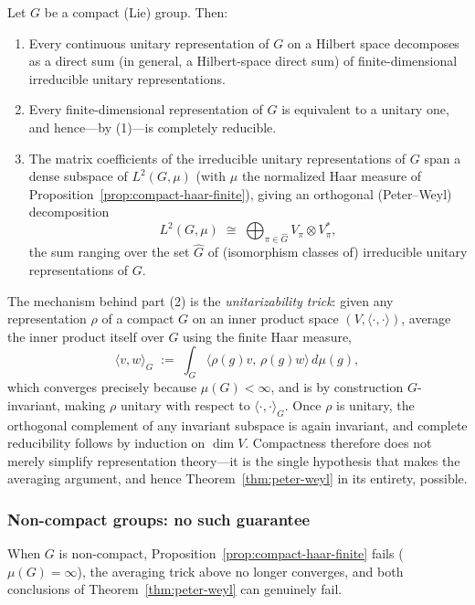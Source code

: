 \documentclass[mathematics,review,submit,moreauthors]{Definitions/mdpi}
\begin{document}
\begin{Theorem}
\label{thm:peter-weyl}
Let $G$ be a compact (Lie) group. Then:
\begin{enumerate}
    \item Every continuous unitary representation of $G$ on a Hilbert space
    decomposes as a direct sum (in general, a Hilbert-space direct sum) of
    finite-dimensional irreducible unitary representations.
    \item Every finite-dimensional representation of $G$ is equivalent to a
    unitary one, and hence---by (1)---is completely reducible.
    \item The matrix coefficients of the irreducible unitary representations
    of $G$ span a dense subspace of $L^2(G,\mu)$ (with $\mu$ the normalized
    Haar measure of Proposition~\ref{prop:compact-haar-finite}), giving an
    orthogonal (Peter--Weyl) decomposition
    \[
        L^2(G,\mu) \;\cong\; \bigoplus_{\pi \in \widehat{G}} V_\pi \otimes V_\pi^*,
    \]
    the sum ranging over the set $\widehat{G}$ of (isomorphism classes of)
    irreducible unitary representations of $G$.
\end{enumerate}
\end{Theorem}

The mechanism behind part (2) is the \emph{unitarizability trick}: given any
representation $\rho$ of a compact $G$ on an inner product space $(V,
\langle\cdot,\cdot\rangle)$, average the inner product itself over $G$ using
the finite Haar measure,
\[
    \langle v, w \rangle_G \;:=\; \int_G \langle \rho(g)v,\, \rho(g)w \rangle \, d\mu(g),
\]
which converges precisely because $\mu(G) < \infty$, and is by construction
$G$-invariant, making $\rho$ unitary with respect to $\langle\cdot,\cdot\rangle_G$.
Once $\rho$ is unitary, the orthogonal complement of any invariant subspace
is again invariant, and complete reducibility follows by induction on
$\dim V$. Compactness therefore does not merely simplify representation
theory---it is the single hypothesis that makes the averaging argument, and
hence Theorem~\ref{thm:peter-weyl} in its entirety, possible.

\subsubsection{Non-compact groups: no such guarantee}
\label{subsubsec:noncompact-representations}

When $G$ is non-compact, Proposition~\ref{prop:compact-haar-finite} fails
($\mu(G) = \infty$), the averaging trick above no longer converges, and both
conclusions of Theorem~\ref{thm:peter-weyl} can genuinely fail.
\end{document}
